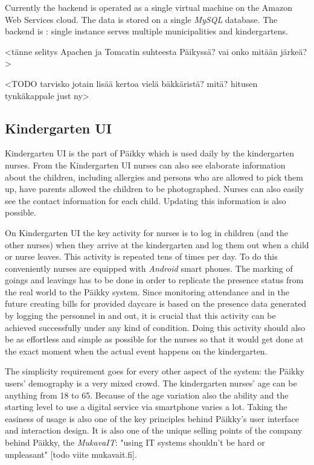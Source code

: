 Currently the backend is operated as a single virtual machine on the Amazon Web Services cloud. The data is stored on a single \textit{MySQL} database. The backend is : single instance serves multiple municipalities and kindergartens. %

<tänne selitys Apachen ja Tomcatin suhteesta Päikyssä? vai onko mitään järkeä?>


<TODO tarvisko jotain lisää kertoa vielä bäkkäristä? mitä? hitusen tynkäkappale just ny>



\subsection{Kindergarten UI}

Kindergarten UI is the part of Päikky which is used daily by the kindergarten nurses. From the Kindergarten UI nurses can also see elaborate information about the children, including allergies and persons who are allowed to pick them up, have parents allowed the children to be photographed. Nurses can also easily see the contact information for each child. Updating this information is also possible. %

On Kindergarten UI the key activity for nurses is to log in children (and the other nurses) when they arrive at the kindergarten and log them out when a child or nurse leaves. This activity is repeated tens of times per day. To do this conveniently nurses are equipped with \textit{Android} smart phones. The marking of goings and leavings has to be done in order to replicate the presence status from the real world to the Päikky system. Since monitoring attendance and in the future creating bills for provided daycare is based on the presence data generated by logging the personnel in and out, it is crucial that this activity can be achieved successfully under any kind of condition. Doing this activity should also be as effortless and simple as possible for the nurses so that it would get done at the exact moment when the actual event happens on the kindergarten. 

The simplicity requirement goes for every other aspect of the system: the Päikky users' demography is a very mixed crowd. The kindergarten nurses' age can be anything from 18 to 65. Because of the age variation also the ability and the starting level to use a digital service via smartphone varies a lot. Taking the easiness of usage is also one of the key principles behind Päikky's user interface and interaction design. It is also one of the unique selling points of the company behind Päikky, the \textit{MukavaIT}: "using IT systems shouldn't be hard or unpleasant" [todo viite mukavait.fi].

